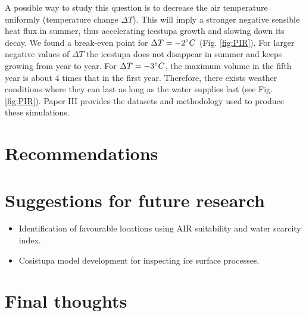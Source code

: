 A possible way to study this question is to decrease the air temperature uniformly (temperature change $\Delta
T$). This will imply a stronger negative sensible heat flux in summer, thus accelerating icestupa growth and
slowing down its decay. We found a break-even point for $\Delta T = -2 ^{\circ} C$ (Fig. \ref{fig:PIR}). For
larger negative values of $\Delta T$ the icestupa does not disappear in summer and keeps growing from year to
year. For $\Delta T = -3 ^{\circ} C$, the maximum volume in the fifth year is about 4 times that in the first
year. Therefore, there exists weather conditions where they can last as long as the water supplies last (see
Fig. \ref{fig:PIR}). Paper III provides the datasets and methodology used to produce these simulations.


\section{Recommendations}

\section{Suggestions for future research}

\begin{itemize} 

\item Identification of favourable locations using AIR suitability and water scarcity index.

\item Cosistupa model development for inspecting ice surface processes.

\end{itemize}

\section{Final thoughts}




